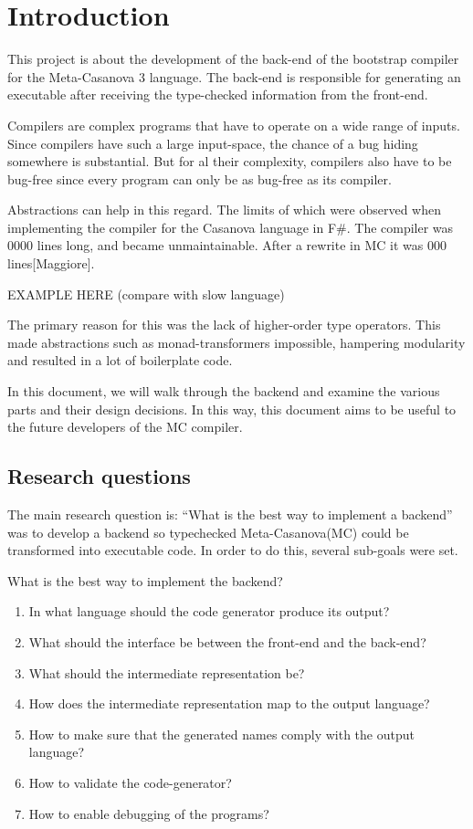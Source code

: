 \section{Introduction}
This project is about the development of the back-end of the bootstrap compiler for the Meta-Casanova 3 language.
The back-end is responsible for generating an executable after receiving the type-checked information from the front-end.

Compilers are complex programs that have to operate on a wide range of inputs.
Since compilers have such a large input-space, the chance of a bug hiding somewhere is substantial. 
But for al their complexity, compilers also have to be bug-free since every program can only be as bug-free as its compiler.

Abstractions can help in this regard.
The limits of which were observed when implementing the compiler for the Casanova language in F\#.
The compiler was 0000 lines long, and became unmaintainable.
After a rewrite in MC it was 000 lines[Maggiore].

EXAMPLE HERE (compare with slow language)

The primary reason for this was the lack of higher-order type operators.
This made abstractions such as monad-transformers impossible, hampering modularity and resulted in a lot of boilerplate code.

In this document, we will walk through the backend and examine the various parts and their design decisions.
In this way, this document aims to be useful to the future developers of the MC compiler.

\subsection{Research questions}

The main research question is: ``What is the best way to implement a backend''  was to develop a backend so typechecked Meta-Casanova(MC) could be transformed into executable code.
In order to do this, several sub-goals were set.

What is the best way to implement the backend?

\begin{enumerate}
    \item In what language should the code generator produce its output?
    \item What should the interface be between the front-end and the back-end?
    \item What should the intermediate representation be?
    \item How does the intermediate representation map to the output language?
    \item How to make sure that the generated names comply with the output language?
    \item How to validate the code-generator?
    \item How to enable debugging of the programs?
\end{enumerate}


